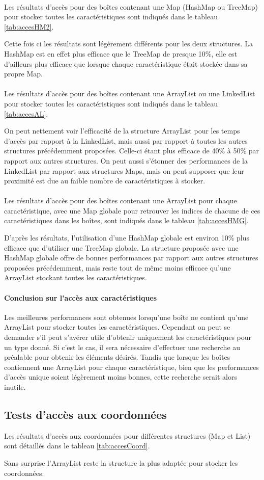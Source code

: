\paragraph{} Les résultats d'accès pour des boîtes contenant une Map (HashMap ou TreeMap) pour stocker toutes les caractéristiques sont indiqués dans le tableau \ref{tab:accesHM2}.

Cette fois ci les résultats sont légèrement différents pour les deux structures. La HashMap est en effet plus efficace que le TreeMap de presque 10\%, elle est d'ailleurs plus efficace que lorsque chaque caractéristique était stockée dans sa propre Map.

\paragraph{} Les résultats d'accès pour des boîtes contenant une ArrayList ou une LinkedList pour stocker toutes les caractéristiques sont indiqués dans le tableau \ref{tab:accesAL}.

On peut nettement voir l'efficacité de la structure ArrayList pour les temps d'accès par rapport à la LinkedList, mais aussi par rapport à toutes les autres structures précédemment proposées. Celle-ci étant plus efficace de 40\% à 50\% par rapport aux autres structures. On peut aussi s'étonner des performances de la LinkedList par rapport aux structures Maps, mais on peut supposer que leur proximité est due au faible nombre de caractéristiques à stocker.

\paragraph{} Les résultats d'accès pour des boîtes contenant une ArrayList pour chaque caractéristique, avec une Map globale pour retrouver les indices de chacune de ces caractéristiques dans les boîtes, sont indiqués dans le tableau \ref{tab:accesHMG}.

D'après les résultats, l'utilisation d'une HashMap globale est environ 10\% plus efficace que d'utiliser une TreeMap globale. La structure proposée avec une HashMap globale offre de bonnes performances par rapport aux autres structures proposées précédemment, mais reste tout de même moins efficace qu'une ArrayList stockant toutes les caractéristiques.

\paragraph{Conclusion sur l'accès aux caractéristiques} Les meilleures performances sont obtenues lorsqu'une boîte ne contient qu'une ArrayList pour stocker toutes les caractéristiques. Cependant on peut se demander s'il peut s'avérer utile d'obtenir uniquement les caractéristiques pour un type donné. Si c'est le cas, il sera nécessaire d'effectuer une recherche au préalable pour obtenir les éléments désirés. Tandis que lorsque les boîtes contiennent une ArrayList pour chaque caractéristique, bien que les performances d'accès unique soient légèrement moins bonnes, cette recherche serait alors inutile.

\subsection{Tests d'accès aux coordonnées}
 Les résultats d'accès aux coordonnées pour différentes structures (Map et List) sont détaillés dans le tableau \ref{tab:accesCoord}.

Sans surprise l'ArrayList reste la structure la plus adaptée pour stocker les coordonnées.
